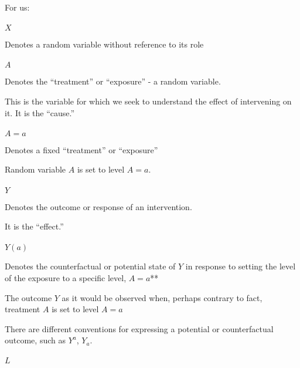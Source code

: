 \documentclass[
  single column]{article}
\makeatletter
\let\oldparagraph\paragraph
\renewcommand{\paragraph}{
    \@ifstar
      \xxxParagraphStar
      \xxxParagraphNoStar
  }
\newcommand{\xxxParagraphStar}[1]{\oldparagraph*{#1}\mbox{}}
\newcommand{\xxxParagraphNoStar}[1]{\oldparagraph{#1}\mbox{}}
\makeatother
\begin{document}
For us:

\paragraph{\texorpdfstring{\(X\)}{X}}\label{x}

Denotes a random variable without reference to its role

\paragraph{\texorpdfstring{\(A\)}{A}}\label{a}

Denotes the ``treatment'' or ``exposure'' - a random variable.

This is the variable for which we seek to understand the effect of
intervening on it. It is the ``cause.''

\paragraph{\texorpdfstring{\(A=a\)}{A=a}}\label{aa}

Denotes a fixed ``treatment'' or ``exposure''

Random variable \(A\) is set to level \(A=a\).

\paragraph{\texorpdfstring{\(Y\)}{Y}}\label{y}

Denotes the outcome or response of an intervention.

It is the ``effect.''

\paragraph{\texorpdfstring{\(Y(a)\)}{Y(a)}}\label{ya}

Denotes the counterfactual or potential state of \(Y\) in response to
setting the level of the exposure to a specific level, \(A=a\)**

The outcome \(Y\) as it would be observed when, perhaps contrary to
fact, treatment \(A\) is set to level \(A=a\)

There are different conventions for expressing a potential or
counterfactual outcome, such as \(Y^a\), \(Y_a\).

\paragraph{\texorpdfstring{\(L\)}{L}}\label{l}
\end{document}

